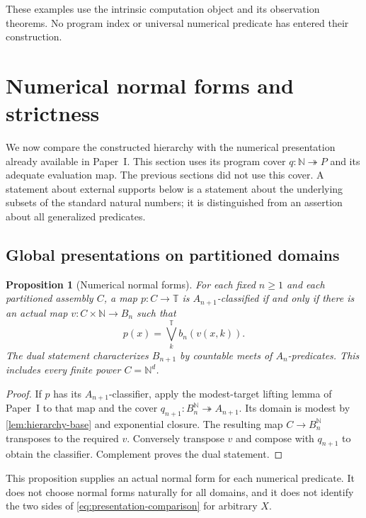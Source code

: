 \documentclass[11pt,a4paper]{article}
\numberwithin{equation}{section}
\newtheorem{proposition}[proposition]{Proposition}
\theoremstyle{definition}
\theoremstyle{remark}
\theoremstyle{plain}
\newcommand{\N}{\mathbb N}
\newcommand{\TV}{\mathbb T}
\newcommand{\onto}{\twoheadrightarrow}
\newcommand{\joinT}{\bigvee^{\TV}}
\begin{document}
These examples use the intrinsic computation object and its observation
theorems. No program index or universal numerical predicate has entered
their construction.

\section{Numerical normal forms and strictness}
\label{sec:numerical}

We now compare the constructed hierarchy with the numerical presentation
already available in Paper~I. This section uses its program cover
$q:\N\onto P$ and its adequate evaluation map. The previous sections
did not use this cover. A statement about external supports below is a
statement about the underlying subsets of the standard natural numbers;
it is distinguished from an assertion about all generalized predicates.

\subsection{Global presentations on partitioned domains}

\begin{proposition}[Numerical normal forms]
\label{prop:numerical-normalforms}
For each fixed $n\geq1$ and each partitioned assembly $C$, a map
$p:C\to\TV$ is $A_{n+1}$-classified if and only if there is an
actual map $v:C\times\N\to B_n$ such that
\begin{equation}\label{eq:numerical-normalform}
 p(x)=\joinT_k b_n(v(x,k)).
\end{equation}
The dual statement characterizes $B_{n+1}$ by countable meets of
$A_n$-predicates. This includes every finite power $C=\N^d$.
\end{proposition}
\begin{proof}
If $p$ has its $A_{n+1}$-classifier, apply the modest-target lifting
lemma of Paper~I to that map and the cover
$q_{n+1}:B_n^{\N}\onto A_{n+1}$. Its domain is modest by
\cref{lem:hierarchy-base} and exponential closure. The resulting
map $C\to B_n^{\N}$ transposes to the required $v$.
Conversely transpose $v$ and compose with $q_{n+1}$ to obtain the
classifier. Complement proves the dual statement.
\end{proof}

This proposition supplies an actual normal form for each numerical
predicate. It does not choose normal forms naturally for all domains,
and it does not identify the two sides of
\eqref{eq:presentation-comparison} for arbitrary $X$.
\end{document}
